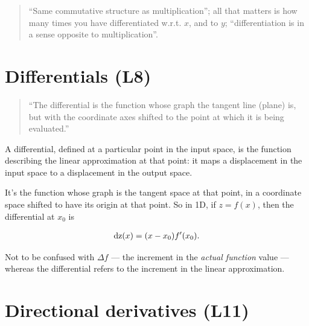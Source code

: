 \documentclass[12pt]{article}
\begin{document}
\begin{quote}
``Same commutative structure as multiplication''; all that matters
is how many times you have differentiated w.r.t. $x$, and to $y$;
``differentiation is in a sense opposite to multiplication''.
\end{quote}

\section{Differentials (L8)}

\begin{quote}
  ``The differential is the function whose graph the tangent line (plane) is,
  but with the coordinate axes shifted to the point at which it is being
  evaluated.''
\end{quote}

A differential, defined at a particular point in the input space, is the
function describing the linear approximation at that point: it maps a
displacement in the input space to a displacement in the output space.

It's the function whose graph is the tangent space at that point, in a
coordinate space shifted to have its origin at that point. So in 1D, if
$z = f(x)$, then the differential at $x_0$ is

\begin{align*}
  \operatorname{\text{dz}}(x) = (x - x_0)f'(x_0).
\end{align*}


Not to be confused with $\Delta f$ --- the increment in the \textit{actual
  function} value --- whereas the differential refers to the increment in the
linear approximation.


\section{Directional derivatives (L11)}


\end{document}
